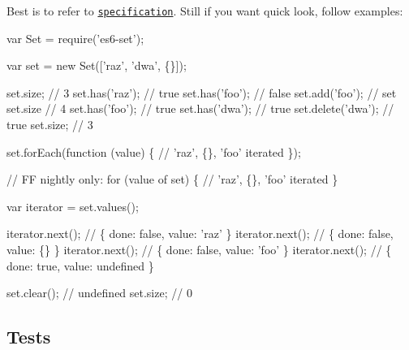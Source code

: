 Best is to refer to \href{http://people.mozilla.org/~jorendorff/es6-draft.html#sec-set-objects}{\tt specification}. Still if you want quick look, follow examples\+:


\begin{DoxyCode}
var Set = require('es6-set');

var set = new Set(['raz', 'dwa', \{\}]);

set.size;          // 3
set.has('raz');    // true
set.has('foo');    // false
set.add('foo');    // set
set.size           // 4
set.has('foo');    // true
set.has('dwa');    // true
set.delete('dwa'); // true
set.size;          // 3

set.forEach(function (value) \{
 // 'raz', \{\}, 'foo' iterated
\});

// FF nightly only:
for (value of set) \{
 // 'raz', \{\}, 'foo' iterated
\}

var iterator = set.values();

iterator.next(); // \{ done: false, value: 'raz' \}
iterator.next(); // \{ done: false, value: \{\} \}
iterator.next(); // \{ done: false, value: 'foo' \}
iterator.next(); // \{ done: true, value: undefined \}

set.clear(); // undefined
set.size; // 0
\end{DoxyCode}


\subsection*{Tests \href{https://travis-ci.org/medikoo/es6-set}{\tt }}

 